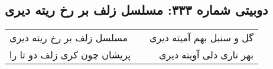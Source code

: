 \begin{center}
\section*{دوبیتی شماره ۳۳۳: مسلسل زلف بر رخ ریته دیری}
\label{sec:333}
\begin{longtable}{l p{0.5cm} r}
مسلسل زلف بر رخ ریته دیری
&&
گل و سنبل بهم آمیته دیری
\\
پریشان چون کری زلف دو تا را
&&
بهر تاری دلی آویته دیری
\\
\end{longtable}
\end{center}
